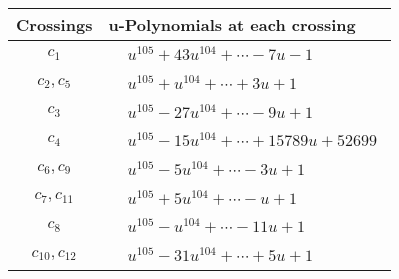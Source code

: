 \documentclass[1p]{elsarticle_modified}
\theoremstyle{definition}
\begin{document}
\begin{tabular}{m{50pt}|m{274pt}}
Crossings & \hspace{64pt}u-Polynomials at each crossing \\
\hline $$\begin{aligned}c_{1}\end{aligned}$$&$\begin{aligned}
&u^{105}+43 u^{104}+\cdots-7 u-1
\end{aligned}$\\
\hline $$\begin{aligned}c_{2},c_{5}\end{aligned}$$&$\begin{aligned}
&u^{105}+u^{104}+\cdots+3 u+1
\end{aligned}$\\
\hline $$\begin{aligned}c_{3}\end{aligned}$$&$\begin{aligned}
&u^{105}-27 u^{104}+\cdots-9 u+1
\end{aligned}$\\
\hline $$\begin{aligned}c_{4}\end{aligned}$$&$\begin{aligned}
&u^{105}-15 u^{104}+\cdots+15789 u+52699
\end{aligned}$\\
\hline $$\begin{aligned}c_{6},c_{9}\end{aligned}$$&$\begin{aligned}
&u^{105}-5 u^{104}+\cdots-3 u+1
\end{aligned}$\\
\hline $$\begin{aligned}c_{7},c_{11}\end{aligned}$$&$\begin{aligned}
&u^{105}+5 u^{104}+\cdots- u+1
\end{aligned}$\\
\hline $$\begin{aligned}c_{8}\end{aligned}$$&$\begin{aligned}
&u^{105}- u^{104}+\cdots-11 u+1
\end{aligned}$\\
\hline $$\begin{aligned}c_{10},c_{12}\end{aligned}$$&$\begin{aligned}
&u^{105}-31 u^{104}+\cdots+5 u+1
\end{aligned}$\\
\hline
\end{tabular}\newpage\renewcommand{\arraystretch}{1}
\end{document}
